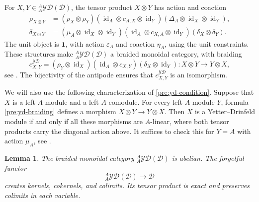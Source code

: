 \documentclass[11pt, a4paper]{article}
\numberwithin{equation}{section}
\newcommand{\D}{\mathcal D}
\newcommand{\YD}{\mathcal{YD}}
\newcommand{\one}{\mathbf 1}
\DeclareMathOperator{\id}{id}
\newtheorem{lemma}[theorem]{Lemma}
\begin{document}
For $X,Y\in{}_A^A\YD(\D)$, the tensor product $X\otimes Y$
has action and coaction
\begin{align*}
 \rho_{X\otimes Y}
 &=(\rho_X\otimes\rho_Y)
   (\id_A\otimes c_{A,X}\otimes\id_Y)
   (\Delta_A\otimes\id_X\otimes\id_Y),\\
 \delta_{X\otimes Y}
 &=(\mu_A\otimes\id_X\otimes\id_Y)
   (\id_A\otimes c_{X,A}\otimes\id_Y)
   (\delta_X\otimes\delta_Y).
\end{align*}
The unit object is $\one$, with action $\varepsilon_A$ and
coaction $\eta_A$, using the unit constraints.
These structures make ${}_A^A\YD(\D)$ a braided monoidal
category, with braiding
\begin{equation}\label{pre:yd-braiding}
 c^{\YD}_{X,Y}
 =(\rho_Y\otimes\id_X)
   (\id_A\otimes c_{X,Y})
   (\delta_X\otimes\id_Y)
 :X\otimes Y\longrightarrow Y\otimes X,
\end{equation}
see \cite[Proposition~3.2]{Simon}.
The bijectivity of the antipode ensures that
$c^{\YD}_{X,Y}$ is an isomorphism.

We will also use the following characterization of
\eqref{pre:yd-condition}.
Suppose that $X$ is a left $A$-module and a left $A$-comodule.
For every left $A$-module $Y$, formula
\eqref{pre:yd-braiding} defines a morphism
$X\otimes Y\to Y\otimes X$.
Then $X$ is a Yetter--Drinfeld module if and only if all these
morphisms are $A$-linear, where both tensor products carry the
diagonal action above.
It suffices to check this for $Y=A$ with action $\mu_A$,
see \cite[Proposition~3.4.5]{rootsys}.


\begin{lemma}\label{pre:yd-abelian}
The braided monoidal category ${}_A^A\YD(\D)$ is abelian.
The forgetful functor
\[
 {}_A^A\YD(\D)\longrightarrow\D
\]
creates kernels, cokernels, and colimits.
Its tensor product is exact and preserves colimits
in each variable.
\end{lemma}
\end{document}
